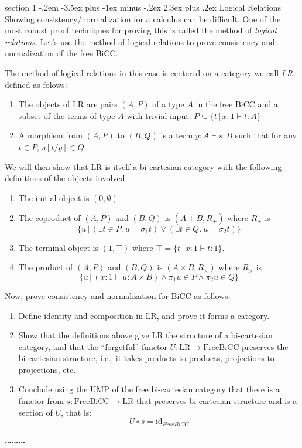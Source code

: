 \documentclass[12pt]{article}
\makeatletter
\newenvironment{problem}{\@startsection
       {section}
       {1}
       {-.2em}
       {-3.5ex plus -1ex minus -.2ex}
       {2.3ex plus .2ex}
       {\pagebreak[3]%
       \large\bf\noindent{Problem }
       }
       }
       {%
       \begin{center}\large\bf \ldots\ldots\ldots\end{center}}
\makeatother
\begin{document}
\begin{problem}{Logical Relations}
  Showing consistency/normalization for a calculus can be
  difficult. One of the most robust proof techniques for proving this
  is called the method of \emph{logical relations}. Let's use the
  method of logical relations to prove consistency and normalization
  of the free BiCC.

  The method of logical relations in this case is centered on a
  category we call \emph{LR} defined as folows:
  \begin{enumerate}
  \item The objects of LR are pairs $(A, P)$ of a type $A$ in the free
    BiCC and a subset of the terms of type $A$ with trivial input: $P
    \subseteq \{ t \,|\, x:1 \vdash t : A \}$
  \item A morphism from $(A, P)$ to $(B, Q)$ is a term $y : A \vdash s
    : B$ such that for any $t \in P$, $s[t/y] \in Q$.
  \end{enumerate}

  We will then show that LR is itself a bi-cartesian category with the
  following definitions of the objects involved:
  \begin{enumerate}
  \item The initial object is $(0, \emptyset)$
  \item The coproduct of $(A, P)$ and $(B, Q)$ is $(A + B, R_+)$ where $R_+$ is
    \[ \{ u \,|\, (\exists t \in P.~ u = \sigma_1 t) \vee (\exists t \in Q.~ u = \sigma_2 t) \} \]
  \item The terminal object is $(1, \top)$ where $\top = \{ t \,|\,
    x:1 \vdash t : 1 \}$.
  \item The product of $(A, P)$ and $(B, Q)$ is $(A \times B, R_\times)$ where $R_\times$ is
    \[ \{ u \,|\, (x : 1 \vdash u : A \times B) \wedge \pi_1 u \in P \wedge \pi_2 u \in Q \} \]
  \end{enumerate}

  Now, prove consistency and normalization for BiCC as follows:
  \begin{enumerate}
  \item Define identity and composition in LR, and prove it forms a
    category.
  \item Show that the definitions above give LR the structure of a
    bi-cartesian category, and that the ``forgetful'' functor $U :
    \textrm{LR} \to \textrm{FreeBiCC}$ preserves the bi-cartesian
    structure, i.e., it takes products to products, projections to
    projections, etc.
  \item Conclude using the UMP of the free bi-cartesian category that
    there is a functor from $s : \textrm{FreeBiCC} \to \textrm{LR}$
    that preserves bi-cartesian structure and is a section of $U$,
    that is:
    \[U \circ s = \textrm{id}_{FreeBiCC}\]


\end{enumerate}
\end{problem}
\end{document}
